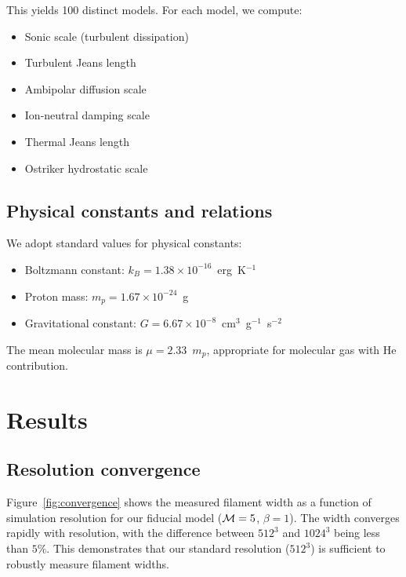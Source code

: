 \documentclass{mnras}
\begin{document}
This yields 100 distinct models. For each model, we compute:
\begin{itemize}
\item Sonic scale (turbulent dissipation)
\item Turbulent Jeans length
\item Ambipolar diffusion scale
\item Ion-neutral damping scale
\item Thermal Jeans length
\item Ostriker hydrostatic scale
\end{itemize}

\subsection{Physical constants and relations}

We adopt standard values for physical constants:
\begin{itemize}
\item Boltzmann constant: $k_B = 1.38 \times 10^{-16}$~erg~K$^{-1}$
\item Proton mass: $m_p = 1.67 \times 10^{-24}$~g
\item Gravitational constant: $G = 6.67 \times 10^{-8}$~cm$^3$~g$^{-1}$~s$^{-2}$
\end{itemize}

The mean molecular mass is $\mu = 2.33$~$m_p$, appropriate for molecular gas with He contribution.


\section{Results}

\subsection{Resolution convergence}

Figure~\ref{fig:convergence} shows the measured filament width as a function of simulation resolution for our fiducial model (${\cal M} = 5$, $\beta = 1$). The width converges rapidly with resolution, with the difference between $512^3$ and $1024^3$ being less than $5\%$. This demonstrates that our standard resolution ($512^3$) is sufficient to robustly measure filament widths.
\end{document}
